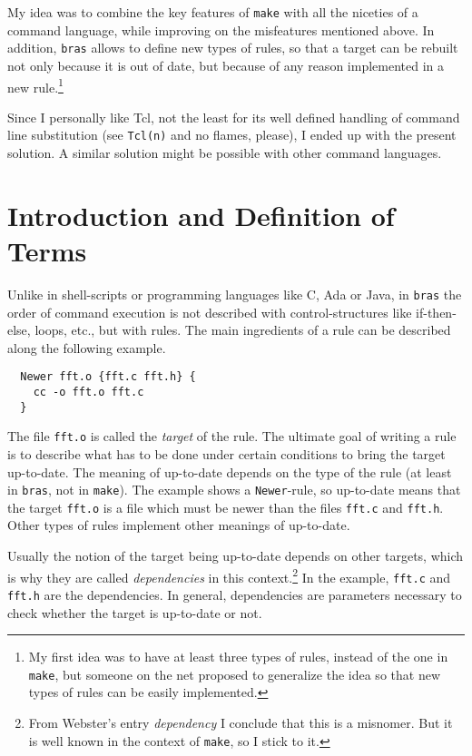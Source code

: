 \documentclass[12pt]{article}
\newcommand{\bras}{\texttt{bras}}
\newcommand{\make}{\texttt{make}}
\begin{document}
My idea was to combine the key features of \texttt{make} with all the
niceties of a command language, while improving on the misfeatures
mentioned above. In addition, \bras{} allows to define new types of
rules, so that a target can be rebuilt not only because it is out of
date, but because of any reason implemented in a new rule.\footnote{My
first idea was to have at least three types of rules, instead of the one
in \make{}, but someone on the net proposed to generalize the idea so
that new types of rules can be easily implemented.}

Since I personally like Tcl, not the least for its well defined
handling of command line substitution (see \texttt{Tcl(n)} and no
flames, please), I ended up with the present solution. A similar
solution might be possible with other command languages.


\section{Introduction and Definition of Terms}
\label{SecDefTerms}

Unlike in shell-scripts or programming languages like C, Ada or Java,
in \bras{} the order of command execution is not described with
control-structures like if-then-else, loops, etc., but with rules.
The main ingredients of a rule can be described along the following
example.

\begin{verbatim}
  Newer fft.o {fft.c fft.h} {
    cc -o fft.o fft.c
  }
\end{verbatim}

The file \texttt{fft.o} is called the \textit{target} of the rule. The
ultimate goal of writing a rule is to describe what has to be done
under certain conditions to bring the target up-to-date. The meaning
of up-to-date depends on the type of the rule (at least in
\bras{}, not in \make{}). The example shows a \texttt{Newer}-rule, so
up-to-date means that the target \texttt{fft.o} is a file which must
be newer than the files \texttt{fft.c} and \texttt{fft.h}.  Other
types of rules implement other meanings of up-to-date.

Usually the notion of the target being up-to-date depends on other
targets, which is why they are called \textit{dependencies} in this
context.\footnote{From Webster's entry \textit{dependency} I conclude
that this is a misnomer. But it is well known in the context of
\make{}, so I stick to it.} In the example,
\texttt{fft.c} and \texttt{fft.h} are the dependencies. In general,
dependencies are parameters necessary to check whether the
target is up-to-date or not.
\end{document}
